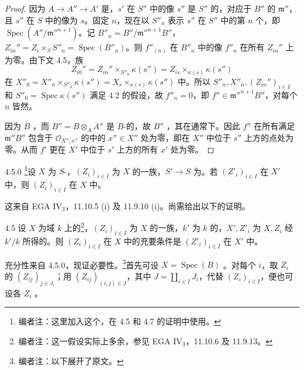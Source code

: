 \begin{proof}
因为 $A\to A''\to A'$ 是，$s'$ 在 $S''$ 中的像 $s''$ 是 $S''$ 的，对应于 $B''$ 的 $\mathfrak m''$，且 $s''$ 在 $S$ 中的像为 $s$。固定 $n$，现在以 $S''_n$ 表示 $s''$ 在 $S''$ 中的第 $n$ 个，即 $\operatorname{Spec}(A''/\mathfrak m''^{n+1})$。记 $B''_n=B''/\mathfrak m''^{n+1}B''$，$Z_{in}''=Z_i\times_S S''_n=\operatorname{Spec}(B''_n)$。则 $f''_{(n)}$ 在 $B''_n$ 中的像 $f''_n$ 在所有 $Z_{in}''$ 上为零。由下文 4.5，族
\[Z_{i0}''=Z_{in}''\times_{S''_n}\kappa(s'')=Z_{is}\times_{\kappa(s)}\kappa(s'')\]
在 $X''_0=X''_n\times_{S''_n}\kappa(s'')=X_s\times_{\kappa(s)}\kappa(s'')$ 中。所以 $S''_n,X''_n,(Z_{in}'')_{i\in I}$ 和 $S''_0=\operatorname{Spec}\kappa(s'')$ 满足 4.2 的假设，故 $f''_n=0$，即 $f''\in\mathfrak m''^{n+1}B''$，对每个 $n$ 皆然。

因为 $B$ ，而 $B''=B\otimes_A A''$ 是 $B$-的，故 $B''$ ，其在通常下。因此 $f''$ 在所有满足 $\mathfrak m''B''$ 包含于 $\mathcal O_{X'',x''}$ 的中的 $x''\in X''$ 处为零，即在 $X''$ 中位于 $s''$ 上方的点处为零。从而 $f'$ 更在 $X'$ 中位于 $s'$ 上方的所有 $x'$ 处为零。
\end{proof}
\begin{SGAresult}{}{4.5.0}
\footnote{编者注：这里加入这个，在 4.5 和 4.7 的证明中使用。}设 $X$ 为 $S$-，$(Z_i)_{i\in I}$ 为 $X$ 的一族，$S'\to S$ 为。若 $(Z'_i)_{i\in I}$ 在 $X'$ 中，则 $(Z_i)_{i\in I}$ 在 $X$ 中。
\end{SGAresult}
这来自 EGA IV$_3$，11.10.5 (i) 及 11.9.10 (i)。尚需给出以下的证明。
\begin{SGAresult}{}{4.5}
设 $X$ 为域 $k$ 上的\footnote{编者注：这一假设实际上多余，参见 EGA IV$_3$，11.10.6 及 11.9.13。}，$(Z_i)_{i\in I}$ 为 $X$ 的一族，$k'$ 为 $k$ 的，$X',Z'_i$ 为 $X,Z_i$ 经 $k'/k$ 所得的。则 $(Z_i)_{i\in I}$ 在 $X$ 中的充要条件是 $(Z'_i)_{i\in I}$ 在 $X'$ 中。
\end{SGAresult}
充分性来自 4.5.0，现证必要性。\footnote{编者注：以下展开了原文。}首先可设 $X=\operatorname{Spec}(B)$ 。对每个 $i$，取 $Z_i$ 的 $(Z_{ij})_{j\in J_i}$；用 $(Z_{ij})_{(i,j)\in J}$，其中 $J=\coprod_{i\in I}J_i$，代替 $(Z_i)_{i\in I}$，便也可设各 $Z_i$ 。

